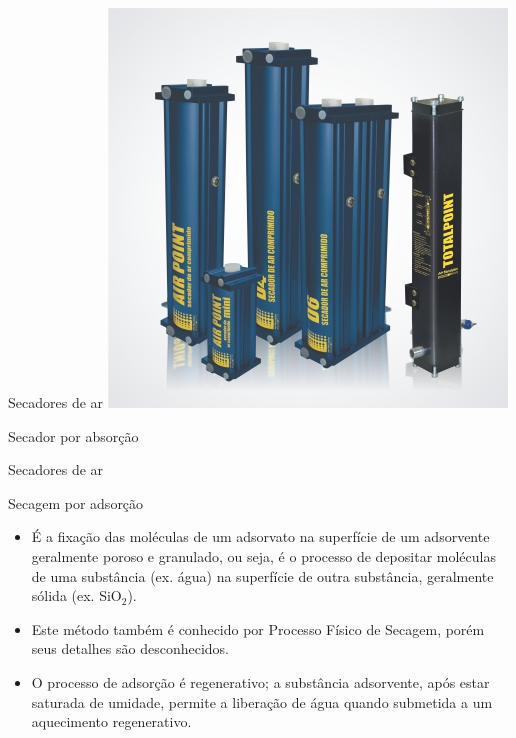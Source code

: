 \begin{frame}{Secadores de ar}
	\centering
	\includegraphics[height=0.8\textheight]{Figuras/Ch13/fig7}
	
	Secador por absorção
\end{frame}


\begin{frame}{Secadores de ar}
	\begin{block}{Secagem por adsorção}
		\begin{itemize}
			\item É a fixação das moléculas de um adsorvato na superfície de um adsorvente geralmente poroso e granulado, ou seja, é o processo de depositar moléculas de uma substância (ex. água) na superfície de outra substância, geralmente sólida (ex. SiO$_2$).
				
			\item Este método também é conhecido por Processo Físico de Secagem, porém seus detalhes são desconhecidos.
			
			\item O processo de adsorção é regenerativo; a substância adsorvente, após estar saturada de umidade, permite a liberação de água quando submetida a um aquecimento	regenerativo.
		\end{itemize}
	\end{block}
\end{frame}


